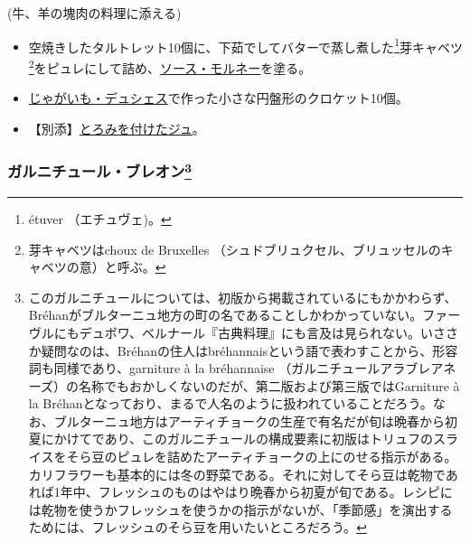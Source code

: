 \begin{recette}


(牛、羊の塊肉の料理に添える)

\begin{itemize}
\item
  空焼きしたタルトレット10個に、下茹でしてバターで蒸し煮した\footnote{étuver
    （エチュヴェ)。}芽キャベツ\footnote{芽キャベツはchoux de Bruxelles
    （シュドブリュクセル、ブリュッセルのキャベツの意）と呼ぶ。}をピュレにして詰め、\protect\hyperlink{sauce-mornay}{ソース・モルネー}を塗る。
\item
  \protect\hyperlink{pommes-de-terre-duchesse}{じゃがいも・デュシェス}で作った小さな円盤形のクロケット10個。
\item
  【別添】\protect\hyperlink{jus-de-veau-lie}{とろみを付けたジュ}。
\end{itemize}

\atoaki{}

\hypertarget{garniture-brehan}{%
\subsubsection[ガルニチュール・ブレオン]{\texorpdfstring{ガルニチュール・ブレオン\footnote{このガルニチュールについては、初版から掲載されているにもかかわらず、Bréhanがブルターニュ地方の町の名であることしかわかっていない。ファーヴルにもデュボワ、ベルナール『古典料理』にも言及は見られない。いささか疑問なのは、Bréhanの住人はbréhannaisという語で表わすことから、形容詞も同様であり、garniture
  à la bréhannaise
  （ガルニチュールアラブレアネーズ）の名称でもおかしくないのだが、第二版および第三版ではGarniture
  à la
  Bréhanとなっており、まるで人名のように扱われていることだろう。なお、ブルターニュ地方はアーティチョークの生産で有名だが旬は晩春から初夏にかけてであり、このガルニチュールの構成要素に初版はトリュフのスライスをそら豆のピュレを詰めたアーティチョークの上にのせる指示がある。カリフラワーも基本的には冬の野菜である。それに対してそら豆は乾物であれば1年中、フレッシュのものはやはり晩春から初夏が旬である。レシピには乾物を使うかフレッシュを使うかの指示がないが、「季節感」を演出するためには、フレッシュのそら豆を用いたいところだろう。}}{ガルニチュール・ブレオン}}\label{garniture-brehan}}



\end{recette}
